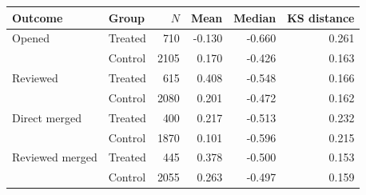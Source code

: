 \small
\begin{tabular}{llrrrr}
\toprule
Outcome & Group & $N$ & Mean & Median & KS distance \\
\midrule
Opened & Treated & 710 & -0.130 & -0.660 & 0.261 \\
       & Control & 2105 & 0.170 & -0.426 & 0.163 \\
Reviewed & Treated & 615 & 0.408 & -0.548 & 0.166 \\
         & Control & 2080 & 0.201 & -0.472 & 0.162 \\
Direct merged & Treated & 400 & 0.217 & -0.513 & 0.232 \\
              & Control & 1870 & 0.101 & -0.596 & 0.215 \\
Reviewed merged & Treated & 445 & 0.378 & -0.500 & 0.153 \\
                & Control & 2055 & 0.263 & -0.497 & 0.159 \\
\bottomrule
\end{tabular}
